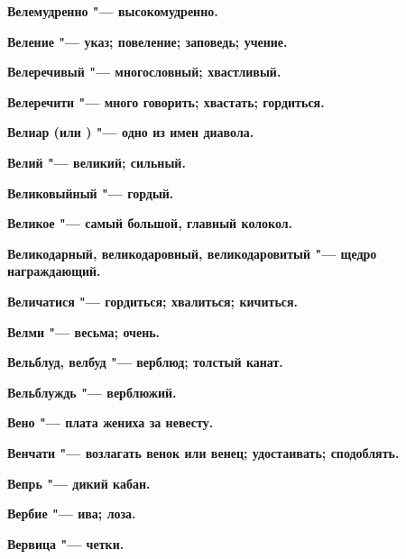 \begin{mymulticols}{2}
\bfseries Велемудренно\normalfont{} "--- высокомудренно. 




\bfseries Веление\normalfont{} "--- указ; повеление; заповедь; учение. 




\bfseries Велеречивый\normalfont{} "--- многословный; хвастливый. 




\bfseries Велеречити\normalfont{} "--- много говорить; хвастать; гордиться. 




\bfseries Велиар\normalfont{} (или \normalfont{}) "--- одно из имен диавола. 




\bfseries Велий\normalfont{} "--- великий; сильный. 




\bfseries Великовыйный\normalfont{} "--- гордый. 




\bfseries Великое\normalfont{} "--- самый большой, главный колокол. 




\bfseries Великодарный, великодаровный, великодаровитый\normalfont{} "--- щедро награждающий. 




\bfseries Величатися\normalfont{} "--- гордиться; хвалиться; кичиться. 




\bfseries Велми\normalfont{} "--- весьма; очень. 




\bfseries Вельблуд, велбуд\normalfont{} "--- верблюд; толстый канат. 




\bfseries Вельблуждь\normalfont{} "--- верблюжий. 




\bfseries Вено\normalfont{} "--- плата жениха за невесту. 




\bfseries Венчати\normalfont{} "--- возлагать венок или венец; удостаивать; сподоблять. 




\bfseries Вепрь\normalfont{} "--- дикий кабан. 




\bfseries Вербие\normalfont{} "--- ива; лоза. 




\bfseries Вервица\normalfont{} "--- четки. 





\end{mymulticols}
